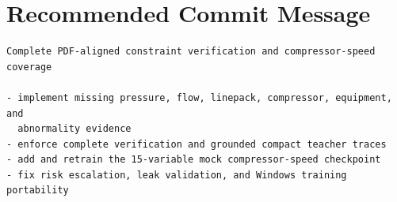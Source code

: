 \documentclass[11pt,a4paper]{article}
\begin{document}
\section{Recommended Commit Message}

\begin{verbatim}
Complete PDF-aligned constraint verification and compressor-speed coverage

- implement missing pressure, flow, linepack, compressor, equipment, and
  abnormality evidence
- enforce complete verification and grounded compact teacher traces
- add and retrain the 15-variable mock compressor-speed checkpoint
- fix risk escalation, leak validation, and Windows training portability
\end{verbatim}
\end{document}
